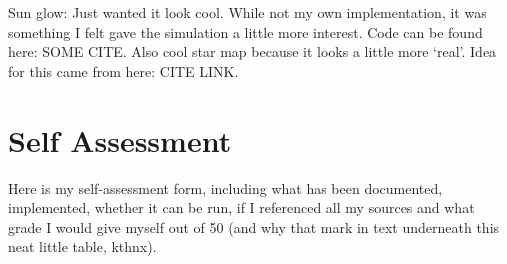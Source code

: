 \documentclass[12pt]{article}
\begin{document}
Sun glow: Just wanted it look cool. While not my own implementation, it was something I felt gave the simulation a little more interest. Code can be found here: SOME CITE. Also cool star map because it looks a little more `real'. Idea for this came from here: CITE LINK.




\clearpage

\section{Self Assessment}
Here is my self-assessment form, including what has been documented, implemented, whether it can be run, if I referenced all my sources and what grade I would give myself out of 50 (and why that mark in text underneath this neat little table, kthnx).


\clearpage

\end{document}
